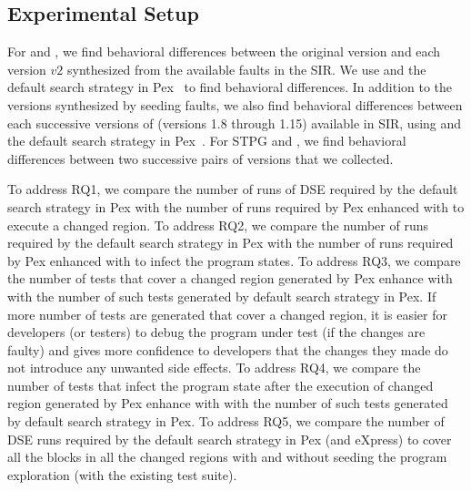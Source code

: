 \subsection{Experimental Setup}

For  and , we find behavioral differences between the original version and each version $v2$ synthesized from the available faults in the SIR. We use  and the default search strategy in Pex~\cite{Pex, fitnex} to find behavioral differences. In addition to the versions synthesized by seeding faults, we also find behavioral differences between each successive versions of  (versions 1.8 through 1.15) available in SIR, using  and the default search strategy in Pex~\cite{Pex, fitnex}. For STPG and , we find behavioral differences between two successive pairs of versions that we collected. 

 To address RQ1, we compare the number of runs of DSE required by the default search strategy in Pex with the number of runs required by Pex enhanced with  to execute a changed region. To address RQ2, we compare the number of runs required by the default search strategy in Pex with the number of runs required by Pex enhanced with  to infect the program states. 
To address RQ3, we compare the number of tests that cover a changed region generated by Pex enhance with  with the number of such tests generated by default search strategy in Pex. If more number of tests are generated that cover a changed region, it is easier for developers (or testers) to debug the program under test (if the changes are faulty) and gives more confidence to developers that the changes they made do not introduce any unwanted side effects.
To address RQ4, we compare the number of tests that infect the program state after the execution of changed region generated by Pex enhance with  with the number of such tests generated by default search strategy in Pex. To address RQ5, we compare the number of DSE runs required by the default search strategy in Pex (and eXpress) to cover all the blocks in all the changed regions with and without seeding the program exploration (with the existing test suite).

